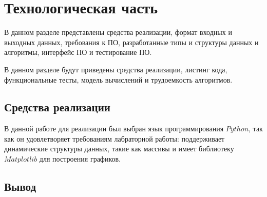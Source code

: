 \chapter{Технологическая часть}

В данном разделе представлены средства реализации, формат входных и выходных данных, требования к ПО, разработанные типы и структуры
данных и алгоритмы, интерфейс ПО и тестирование ПО.

В данном разделе будут приведены средства реализации, листинг кода, функциональные тесты, модель вычислений и трудоемкость алгоритмов.

\section{Средства реализации}
В данной работе для реализации был выбран язык программирования $Python$\cite{python-city}, так как он удовлетворяет требованиям лабраторной работы: поддерживает динамические структуры данных,
такие как массивы и имеет библиотеку $Matplotlib$\cite{matplotlib-lib} для построения графиков.





\section*{Вывод}

%
%

\clearpage
